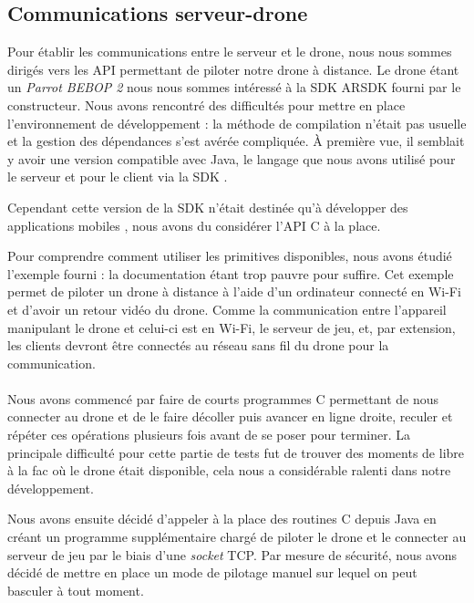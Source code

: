 \subsection{Communications serveur-drone}\label{impl}
Pour établir les communications entre le serveur et le drone, nous nous sommes dirigés vers les API permettant de piloter notre drone à distance. Le drone étant un \textit{Parrot BEBOP 2} nous nous sommes intéressé à la SDK ARSDK fourni par le constructeur. Nous avons rencontré des difficultés pour mettre en place l'environnement de développement : la méthode de compilation n'était pas usuelle et la gestion des dépendances s'est avérée compliquée. À première vue, il semblait y avoir une version compatible avec Java, le langage que nous avons utilisé pour le serveur et pour le client via la SDK \android{}.

Cependant cette version de la SDK n'était destinée qu'à développer des applications mobiles \android{}, nous avons du considérer l'API C à la place.

Pour comprendre comment utiliser les primitives disponibles, nous avons étudié l'exemple fourni : la documentation étant trop pauvre pour suffire. Cet exemple permet de piloter un drone à distance à l'aide d'un ordinateur connecté en Wi-Fi et d'avoir un retour vidéo du drone. Comme la communication entre l'appareil manipulant le drone et celui-ci est en Wi-Fi, le serveur de jeu, et, par extension, les clients \android{} devront être connectés au réseau sans fil du drone pour la communication.

\paragraph{}
Nous avons commencé par faire de courts programmes C permettant de nous connecter au drone et de le faire décoller puis avancer en ligne droite, reculer et répéter ces opérations plusieurs fois avant de se poser pour terminer. La principale difficulté pour cette partie de tests fut de trouver des moments de libre à la fac où le drone était disponible, cela nous a considérable ralenti dans notre développement.

Nous avons ensuite décidé d'appeler à la place des routines C depuis Java en créant un programme supplémentaire chargé de piloter le drone et le connecter au serveur de jeu par le biais d'une \textit{socket} TCP.
Par mesure de sécurité, nous avons décidé de mettre en place un mode de pilotage manuel sur lequel on peut basculer à tout moment.

